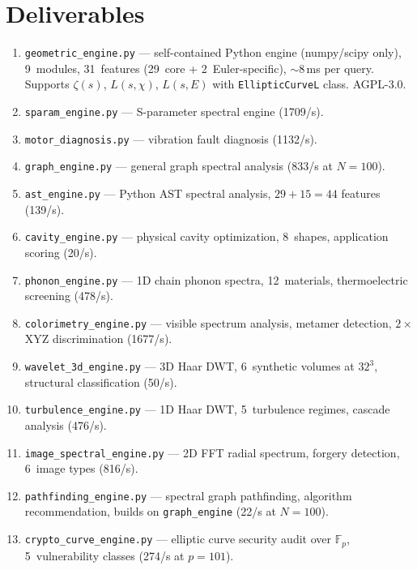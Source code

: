 \documentclass[11pt]{amsart}
\begin{document}
\section{Deliverables}
\label{sec:deliverables}

\begin{enumerate}[label=(\alph*)]
\item \texttt{geometric\_engine.py} --- self-contained Python engine
  (numpy/scipy only), 9~modules, 31~features (29~core + 2~Euler-specific),
  ${\sim}8\,$ms per query.
  Supports $\zeta(s)$, $L(s,\chi)$, $L(s,E)$ with \texttt{EllipticCurveL}
  class. AGPL-3.0.
\item \texttt{sparam\_engine.py} --- S-parameter spectral engine (1709/s).
\item \texttt{motor\_diagnosis.py} --- vibration fault diagnosis (1132/s).
\item \texttt{graph\_engine.py} --- general graph spectral analysis
  (833/s at $N=100$).
\item \texttt{ast\_engine.py} --- Python AST spectral analysis,
  $29 + 15 = 44$ features (139/s).
\item \texttt{cavity\_engine.py} --- physical cavity optimization,
  8~shapes, application scoring (20/s).
\item \texttt{phonon\_engine.py} --- 1D chain phonon spectra, 12~materials,
  thermoelectric screening (478/s).
\item \texttt{colorimetry\_engine.py} --- visible spectrum analysis, metamer
  detection, $2\times$ XYZ discrimination (1677/s).
\item \texttt{wavelet\_3d\_engine.py} --- 3D Haar DWT, 6~synthetic volumes
  at $32^3$, structural classification (50/s).
\item \texttt{turbulence\_engine.py} --- 1D Haar DWT, 5~turbulence regimes,
  cascade analysis (476/s).
\item \texttt{image\_spectral\_engine.py} --- 2D FFT radial spectrum,
  forgery detection, 6~image types (816/s).
\item \texttt{pathfinding\_engine.py} --- spectral graph pathfinding,
  algorithm recommendation, builds on \texttt{graph\_engine} (22/s at
  $N=100$).
\item \texttt{crypto\_curve\_engine.py} --- elliptic curve security audit
  over $\mathbb{F}_p$, 5~vulnerability classes (274/s at $p=101$).
\end{enumerate}
\end{document}
